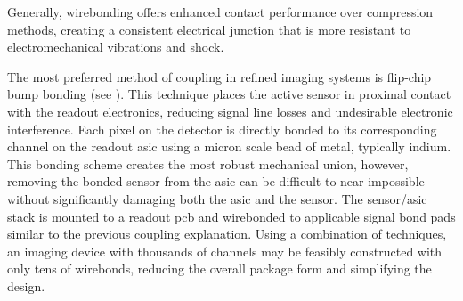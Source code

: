 \documentclass[../../../main.tex]{subfiles}%
\begin{document}
    Generally, wirebonding offers enhanced contact performance over compression methods, creating a consistent electrical junction that is more resistant to electromechanical vibrations and shock. 
    \par%
    The most preferred method of coupling in refined imaging systems is flip-chip bump bonding (see ). 
    This technique places the active sensor in proximal contact with the readout electronics, reducing signal line losses and undesirable electronic interference.
    Each pixel on the detector is directly bonded to its corresponding channel on the readout \gls{asic} using a micron scale bead of metal, typically indium.
    This bonding scheme creates the most robust mechanical union, however, removing the bonded sensor from the \gls{asic} can be difficult to near impossible without significantly damaging both the \gls{asic} and the sensor.
    The sensor/\gls{asic} stack is mounted to a readout \gls{pcb} and wirebonded to applicable signal bond pads similar to the previous coupling explanation.
    Using a combination of techniques, an imaging device with thousands of channels may be feasibly constructed with only tens of wirebonds, reducing the overall package form and simplifying the design.
\end{document}
